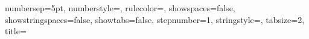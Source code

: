 {  numbersep=5pt,                   %
  numberstyle=\tiny\color{grigio}, %
  rulecolor=\color{black},         %
  showspaces=false,                %
  showstringspaces=false,          %
  showtabs=false,                  %
  stepnumber=1,                    %
  stringstyle=\color{blumarino},   %
  tabsize=2,	                   %
  title=\lstname%
}
